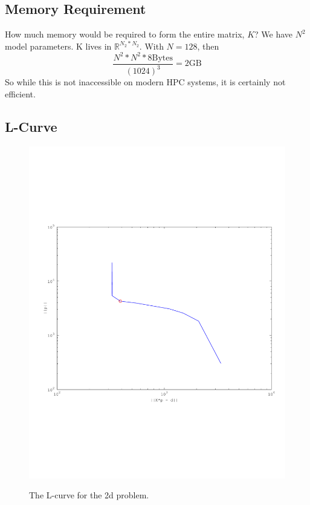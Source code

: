 \documentclass{article}
\begin{document}
\subsection{Memory Requirement}

How much memory would be required to form the entire matrix, $K$?
We have $N^2$ model parameters. K lives in $\mathbb{R}^{N_2 * N_2}$. 
With $N=128$, then 
\begin{equation}
\frac{N^2 * N^2 * 8 \text{Bytes}}{(1024)^3} = 2 \text{GB}
\end{equation}
So while this is not inaccessible on modern HPC systems, it is certainly not efficient. 

\subsection{L-Curve}

\begin{figure}[!htb]
  \includegraphics[scale=.5]{plots/L-curve2d.pdf}
  \label{fig:l2d}
  \caption{The L-curve for the 2d problem.} 
\end{figure}
\end{document}
